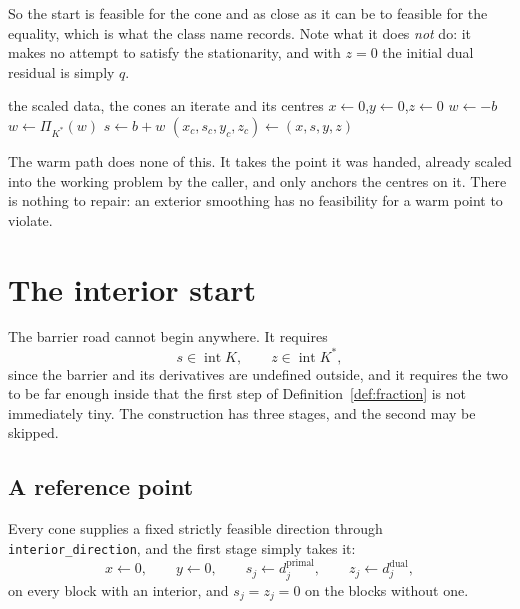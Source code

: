 \documentclass[a4paper,11pt]{book}
\theoremstyle{plain}
\theoremstyle{definition}
\theoremstyle{remark}
\numberwithin{equation}{chapter}
\numberwithin{algorithm}{chapter}
\newcommand{\proj}[2]{\Pi_{#2}\!\left(#1\right)}
\newcommand{\intr}{\operatorname{int}}
\begin{document}
	So the start is feasible for the cone and as close as it can be to feasible
	for the equality, which is what the class name records. Note what it does
	\emph{not} do: it makes no attempt to satisfy the stationarity, and with
	$z=0$ the initial dual residual is simply $q$.

	\begin{algorithm}[H]
		\caption{The semismooth cold start}
		\begin{algorithmic}[1]
			\Require the scaled data, the cones
			\Ensure an iterate and its centres
			\State $x\gets0$,\quad $y\gets0$,\quad $z\gets0$
			\State $w\gets-b$
			\State $w\gets\proj{w}{K^*}$
			\State $s\gets b+w$
			\Comment{$=\proj{b}{K}$ by Proposition~\ref{prop:feasiblestart}}
			\State $(x_c,s_c,y_c,z_c)\gets(x,s,y,z)$
		\end{algorithmic}
	\end{algorithm}

	The warm path does none of this. It takes the point it was handed, already
	scaled into the working problem by the caller, and only anchors the centres
	on it. There is nothing to repair: an exterior smoothing has no feasibility
	for a warm point to violate.

	\section{The interior start}

	The barrier road cannot begin anywhere. It requires
	\[
	s\in\intr K,
	\qquad
	z\in\intr K^* ,
	\]
	since the barrier and its derivatives are undefined outside, and it requires
	the two to be far enough inside that the first step of
	Definition~\ref{def:fraction} is
	not immediately tiny. The construction has three stages, and the second may
	be skipped.

	\subsection{A reference point}

	Every cone supplies a fixed strictly feasible direction through
	\texttt{interior\_direction}, and the first stage simply takes it:
	\[
	x\gets0,
	\qquad
	y\gets0,
	\qquad
	s_j\gets d_j^{\mathrm{primal}},
	\qquad
	z_j\gets d_j^{\mathrm{dual}} ,
	\]
	on every block with an interior, and $s_j=z_j=0$ on the blocks without one.
\end{document}
